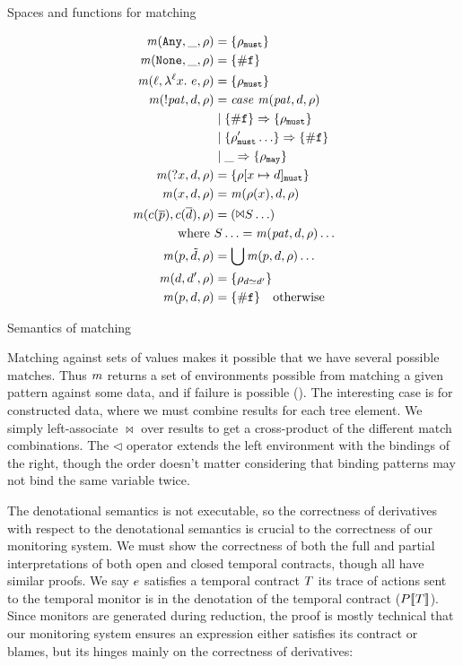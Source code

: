   {\caption{Spaces and functions for matching}\label{fig:matchspace}}
  {\begin{align*}
    \matches(\sany, \_, \menv) &= \setof{\menv_\must} \\
    \matches(\snone, \_, \menv) &= \setof{\nomatch} \\
    \matches(\mtoplevelname, \snlam{\mtoplevelname}{\mvar}{\mexp}, \menv) &= \setof{\menv_\must} \\
    \matches(\snegpat{\mvpat}, \mdata, \menv) &= \mathit{case}\ \matches(\mvpat, \mdata, \menv)\\
      &\alt \setof{\nomatch} \Rightarrow \setof{\menv_\must} \\
      &\alt \setof{\menv'_\must\ldots} \Rightarrow \setof{\nomatch} \\
      &\alt \_ \Rightarrow \setof{\menv_\may} \\
    \matches(\sbind{\mvar}, \mdata, \menv) &= \setof{\menv[\mvar \mapsto \mdata]_\must} \\
    \matches(\mvar, \mdata, \menv) &= \matches(\menv(\mvar), \mdata, \menv) \\
    \matches(\mconstructor(\many{\mpat}), \mconstructor(\many{\mdata}), \menv) &= (\Bowtie S \ldots) \\
    \text{where }& S \ldots = \matches(\mvpat, \mdata, \menv) \ldots \\
    \matches(\mpat, \isset{\mdata}, \menv) &= \bigcup \matches(\mpat,\mdata,\menv)\ldots \\
    \matches(\mdata, \mdata', \menv) &= \setof{\menv_{\mdata \simeq \mdata'}} \\
    \matches(\mpat, \mdata, \menv) &= \setof{\nomatch} \quad
    \text{otherwise}
  \end{align*}}{\caption{Semantics of matching}\label{fig:matchsem}}

Matching against sets of values makes it possible that we have several possible matches.
%
Thus $\mathit{m}$ returns a set of environments possible from matching a given pattern against some data, and if failure is possible (\nomatch).
%
The interesting case is for constructed data, where we must combine results for each tree element.
%
We simply left-associate $\bowtie$ over results to get a cross-product of the different match combinations.
%
The $\triangleleft$ operator extends the left environment with the bindings of the right, though the order doesn't matter considering that binding patterns may not bind the same variable twice.
%

The denotational semantics is not executable, so the correctness of derivatives with respect to the denotational semantics is crucial to the correctness of our monitoring system.
%
We must show the correctness of both the full and partial interpretations of both open and closed temporal contracts, though all have similar proofs.
%
We say $e$ satisfies a temporal contract $T$ its trace of actions sent to the temporal monitor is in the denotation of the temporal contract ($P[\![ T ]\!]$).
%
Since monitors are generated during reduction, the proof is mostly technical that our monitoring system ensures an expression either satisfies its contract or blames, but its hinges mainly on the correctness of derivatives:
%

